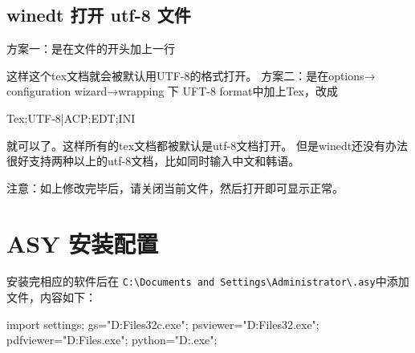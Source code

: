 \subsection{winedt 打开 utf-8 文件}
方案一：是在文件的开头加上一行
\begin{cmd}
\end{cmd}
这样这个tex文档就会被默认用UTF-8的格式打开。
方案二：是在options→ configuration wizard→wrapping 下 UFT-8 format中加上Tex，改成
\begin{cmd}
Tex;UTF-8|ACP;EDT;INI
\end{cmd}

就可以了。这样所有的tex文档都被默认是utf-8文档打开。
但是winedt还没有办法很好支持两种以上的utf-8文档，比如同时输入中文和韩语。

注意：如上修改完毕后，请关闭当前文件，然后打开即可显示正常。



\section{ASY 安装配置}
安装完相应的软件后在 \verb|C:\Documents and Settings\Administrator\.asy|中添加  文件，内容如下：
\begin{cmd}
import settings;
gs="D:\Program Files\gs{}\bin\gswin32c.exe";
psviewer="D:\Program Files\Ghostgum\gsview\gsview32.exe";
pdfviewer="D:\Program Files\Adobe{}\Acrobat\Acrobat.exe";
python="D:\python.exe";
\end{cmd}

